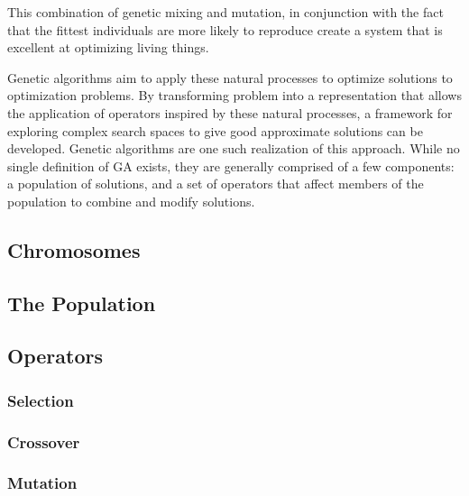 This combination of genetic mixing and mutation, in conjunction with the fact that the fittest individuals are more likely to reproduce create a system that is excellent at optimizing living things. 
  
Genetic algorithms aim to apply these natural processes to optimize solutions to optimization problems. By transforming problem into a representation that allows the application of operators inspired by these natural processes, a framework for exploring complex search spaces to give good approximate solutions can be developed. Genetic algorithms are one such realization of this approach. While no single definition of GA exists, they are generally comprised of a few components: a population of solutions, and a set of operators that affect members of the population to combine and modify solutions.

\subsection{Chromosomes}


\subsection{The Population}


\subsection{Operators}


\subsubsection{Selection}


\subsubsection{Crossover}


\subsubsection{Mutation}


